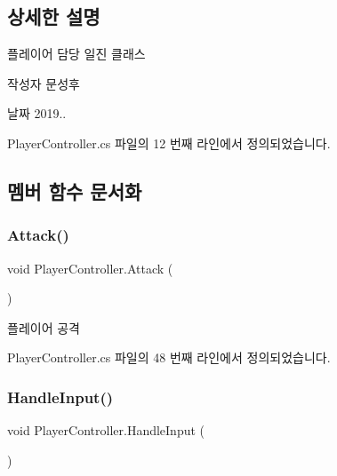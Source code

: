 \subsection{상세한 설명}
플레이어 담당 일진 클래스 

\begin{DoxyAuthor}{작성자}
문성후 
\end{DoxyAuthor}
\begin{DoxyDate}{날짜}
2019.. 
\end{DoxyDate}


Player\+Controller.\+cs 파일의 12 번째 라인에서 정의되었습니다.



\subsection{멤버 함수 문서화}
\mbox{\label{class_player_controller_a473a610cfe2a374d5cb39b3c44881d11}} 
\subsubsection{\texorpdfstring{Attack()}{Attack()}}
{\footnotesize\ttfamily void Player\+Controller.\+Attack (\begin{DoxyParamCaption}{ }\end{DoxyParamCaption})}



플레이어 공격 



Player\+Controller.\+cs 파일의 48 번째 라인에서 정의되었습니다.


\begin{DoxyCode}{0}

\end{DoxyCode}
\mbox{\label{class_player_controller_a5ebfe098b2dc258ca8349e6951766883}} 
\subsubsection{\texorpdfstring{HandleInput()}{HandleInput()}}
{\footnotesize\ttfamily void Player\+Controller.\+Handle\+Input (\begin{DoxyParamCaption}{ }\end{DoxyParamCaption})}



